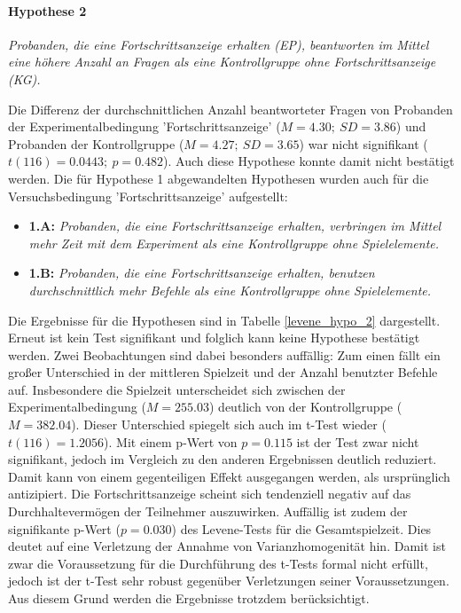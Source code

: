 \paragraph{Hypothese 2 }
\begin{center}
    \textit{Probanden, die eine Fortschrittsanzeige erhalten (EP), beantworten im Mittel eine höhere Anzahl an Fragen als eine Kontrollgruppe ohne Fortschrittsanzeige (KG).} 
\end{center}

Die Differenz der durchschnittlichen Anzahl beantworteter Fragen von Probanden der Experimentalbedingung 'Fortschrittsanzeige' ($M =4.30;\:SD=3.86$) und Probanden der Kontrollgruppe ($M=4.27;\:SD=3.65$) war nicht signifikant ($t (116) = 0.0443;\: p = 0.482$). Auch diese Hypothese konnte damit nicht bestätigt werden. Die für Hypothese 1 abgewandelten Hypothesen wurden auch für die Versuchsbedingung 'Fortschrittsanzeige' aufgestellt: 

\begin{itemize}
    \item \textbf{1.A:} \textit{Probanden, die eine Fortschrittsanzeige erhalten, verbringen im Mittel mehr Zeit mit dem Experiment als eine Kontrollgruppe ohne Spielelemente.}
    \item \textbf{1.B:} \textit{Probanden, die eine Fortschrittsanzeige erhalten, benutzen durchschnittlich mehr Befehle als eine Kontrollgruppe ohne Spielelemente.} 
\end{itemize}

Die Ergebnisse für die Hypothesen sind in Tabelle \ref{levene_hypo_2} dargestellt. Erneut ist kein Test signifikant und folglich kann keine Hypothese bestätigt werden. Zwei Beobachtungen sind dabei besonders auffällig: Zum einen fällt ein großer Unterschied in der mittleren Spielzeit und der Anzahl benutzter Befehle auf. Insbesondere die Spielzeit unterscheidet sich zwischen der Experimentalbedingung ($M=255.03$) deutlich von der Kontrollgruppe ($M=382.04$). Dieser Unterschied spiegelt sich auch im t-Test wieder ($t(116)=1.2056$). Mit einem p-Wert von $p=0.115$ ist der Test zwar nicht signifikant, jedoch im Vergleich zu den anderen Ergebnissen deutlich reduziert. Damit kann von einem gegenteiligen Effekt ausgegangen werden, als ursprünglich antizipiert. Die Fortschrittsanzeige scheint sich tendenziell negativ auf das Durchhaltevermögen der Teilnehmer auszuwirken. Auffällig ist zudem der signifikante p-Wert ($p=0.030$) des Levene-Tests für die Gesamtspielzeit. Dies deutet auf eine Verletzung der Annahme von Varianzhomogenität hin. Damit ist zwar die Voraussetzung für die Durchführung des t-Tests formal nicht erfüllt, jedoch ist der t-Test sehr robust gegenüber Verletzungen seiner Voraussetzungen. Aus diesem Grund werden die Ergebnisse trotzdem berücksichtigt.

